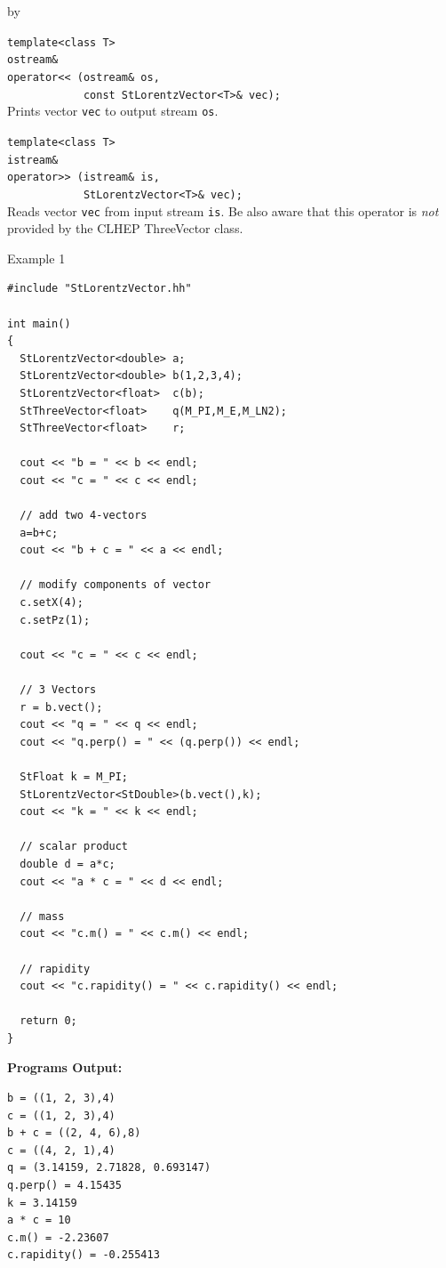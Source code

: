 \documentclass[twoside]{article}
\newcommand{\comp}[1]{\texttt{#1}}%
\newcommand{\entrylabel}[1]{\mbox{\textbf{{#1}}}\hfil}%
\newenvironment{entry}
{\begin{list}{}%
    {\renewcommand{\makelabel}{\entrylabel}%
     \setlength{\labelwidth}{90pt}%
     \setlength{\leftmargin}{\labelwidth}
     \advance\leftmargin by \labelsep%
      }%
    }%
  {\end{list}}
\newcommand{\Entrylabel}[1]%
{\raisebox{0pt}[1ex][0pt]{\makebox[\labelwidth][l]%
    {\parbox[t]{\labelwidth}{\hspace{0pt}\textbf{{#1}}}}}}
\newenvironment{Entry}%
{\renewcommand{\entrylabel}{\Entrylabel}\begin{entry}}%
  {\end{entry}}
\begin{document}
\begin{Entry}
    \verb+template<class T>+\\
    \verb+ostream&+\\
    \verb+operator<< (ostream& os,+\\
    \verb+            const StLorentzVector<T>& vec);+\\
    Prints vector \comp{vec} to output stream \comp{os}.
    
    \verb+template<class T>+\\
    \verb+istream&+\\
    \verb+operator>> (istream& is,+\\
    \verb+            StLorentzVector<T>& vec);+\\
    Reads vector \comp{vec} from input stream \comp{is}.
    Be also aware that this operator is {\em not} provided by
    the CLHEP ThreeVector class.

\item[Example 1]
{\footnotesize
\begin{verbatim}
#include "StLorentzVector.hh"

int main()
{
  StLorentzVector<double> a;
  StLorentzVector<double> b(1,2,3,4);
  StLorentzVector<float>  c(b);
  StThreeVector<float>    q(M_PI,M_E,M_LN2);
  StThreeVector<float>    r;
  
  cout << "b = " << b << endl;
  cout << "c = " << c << endl;

  // add two 4-vectors
  a=b+c;
  cout << "b + c = " << a << endl;

  // modify components of vector
  c.setX(4);
  c.setPz(1);

  cout << "c = " << c << endl;

  // 3 Vectors
  r = b.vect();
  cout << "q = " << q << endl;
  cout << "q.perp() = " << (q.perp()) << endl;

  StFloat k = M_PI;
  StLorentzVector<StDouble>(b.vect(),k);
  cout << "k = " << k << endl;
  
  // scalar product
  double d = a*c;
  cout << "a * c = " << d << endl;

  // mass
  cout << "c.m() = " << c.m() << endl;

  // rapidity
  cout << "c.rapidity() = " << c.rapidity() << endl;
      
  return 0;
}
\end{verbatim}
}%
{\bf Programs Output:}
{\footnotesize
\begin{verbatim}
b = ((1, 2, 3),4)
c = ((1, 2, 3),4)
b + c = ((2, 4, 6),8)
c = ((4, 2, 1),4)
q = (3.14159, 2.71828, 0.693147)
q.perp() = 4.15435
k = 3.14159
a * c = 10
c.m() = -2.23607
c.rapidity() = -0.255413


\end{verbatim}}
\end{Entry}
\end{document}
